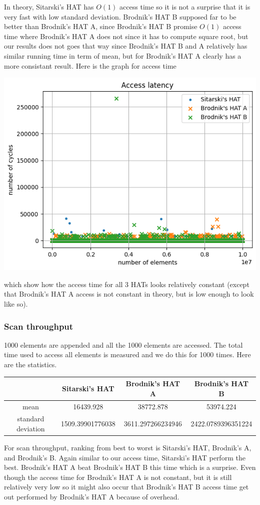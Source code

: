 \documentclass{article} %
\begin{document}
    In theory, Sitarski's HAT has $O(1)$ access time so it is not a surprise that it is very fast with low standard deviation.
    Brodnik's HAT B supposed far to be better than Brodnik's HAT A, since Brodnik's HAT B promise $O(1)$ access time where
    Brodnik's HAT A does not since it has to compute square root, but our results does not goes that way since Brodnik's HAT B and A
    relatively has similar running time in term of mean, but for Brodnik's HAT A clearly has a more consistant result.
    Here is the graph for access time
    \begin{center}
        \includegraphics{graphics/hat_access.png}
    \end{center}
    which show how the access time for all 3 HATs looks relatively constant (except that Brodnik's HAT A access is not constant in theory, but is low enough to look like so).

    \subsubsection*{Scan throughput}
    1000 elements are appended and all the 1000 elements are accessed. The total time used to access all elements is measured and we do this for 1000 times.
    Here are the statistics. 
    \begin{center}
        \begin{tabular}{|c|c|c|c|}\hline
            & Sitarski's HAT & Brodnik's HAT A & Brodnik's HAT B\\\hline
            mean &  16439.928 & 38772.878 & 53974.224\\\hline
            standard deviation & 1509.39901776038  & 3611.297266234946 & 2422.0789396351224\\\hline 
        \end{tabular}
    \end{center}
    For scan throughput, ranking from best to worst is Sitarski's HAT, Brodnik's A, and Brodnik's B.
    Again similar to our access time, Sitarski's HAT perform the best. Brodnik's HAT A beat Brodnik's HAT B this time which is a
    surprise. Even though the access time for Brodnik's HAT A is not constant, but it is still relatively very low
    so it might also occur that Brodnik's HAT B access time get out performed by Brodnik's HAT A because of overhead.
\end{document}
